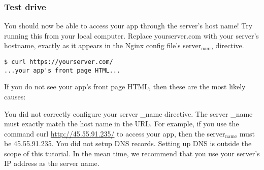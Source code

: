 \documentclass[11pt]{article}
\begin{document}
\subsubsection{Test drive}
\label{sec:org2540b70}

You should now be able to access your app through the server's host name! Try running this from your local computer. Replace yourserver.com with your server's hostname, exactly as it appears in the Nginx config file's server\(_{\text{name}}\) directive.

\begin{verbatim}
$ curl https://yourserver.com/
...your app's front page HTML...
\end{verbatim}

If you do not see your app's front page HTML, then these are the most likely causes:

You did not correctly configure your server \_name directive. The server \_name must exactly match the host name in the URL. For example, if you use the command curl \url{http://45.55.91.235/} to access your app, then the server\(_{\text{name}}\) must be 45.55.91.235.
You did not setup DNS records. Setting up DNS is outside the scope of this tutorial. In the mean time, we recommend that you use your server's IP address as the server name.
\end{document}
